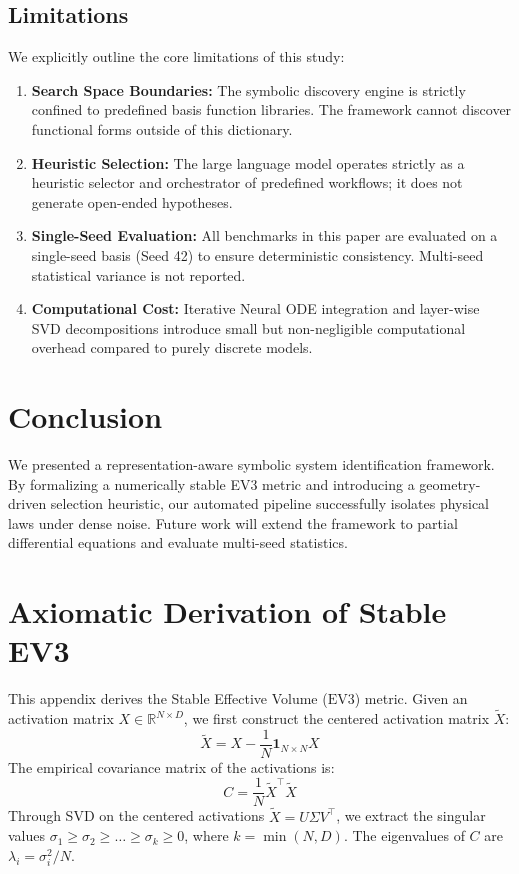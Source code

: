 \documentclass[twocolumn]{article}
\begin{document}
\subsection{Limitations}
We explicitly outline the core limitations of this study:
\begin{enumerate}
    \item \textbf{Search Space Boundaries:} The symbolic discovery engine is strictly confined to predefined basis function libraries. The framework cannot discover functional forms outside of this dictionary.
    \item \textbf{Heuristic Selection:} The large language model operates strictly as a heuristic selector and orchestrator of predefined workflows; it does not generate open-ended hypotheses.
    \item \textbf{Single-Seed Evaluation:} All benchmarks in this paper are evaluated on a single-seed basis (Seed 42) to ensure deterministic consistency. Multi-seed statistical variance is not reported.
    \item \textbf{Computational Cost:} Iterative Neural ODE integration and layer-wise SVD decompositions introduce small but non-negligible computational overhead compared to purely discrete models.
\end{enumerate}

\section{Conclusion}
\label{sec:conclusion}
We presented a representation-aware symbolic system identification framework. By formalizing a numerically stable EV3 metric and introducing a geometry-driven selection heuristic, our automated pipeline successfully isolates physical laws under dense noise. Future work will extend the framework to partial differential equations and evaluate multi-seed statistics.




\appendix
\section{Axiomatic Derivation of Stable EV3}
This appendix derives the Stable Effective Volume ($\text{EV3}$) metric. Given an activation matrix $X \in \mathbb{R}^{N \times D}$, we first construct the centered activation matrix $\tilde{X}$:
\begin{equation}
    \tilde{X} = X - \frac{1}{N} \mathbf{1}_{N \times N} X
\end{equation}
The empirical covariance matrix of the activations is:
\begin{equation}
    C = \frac{1}{N} \tilde{X}^\top \tilde{X}
\end{equation}
Through SVD on the centered activations $\tilde{X} = U \Sigma V^\top$, we extract the singular values $\sigma_1 \ge \sigma_2 \ge \dots \ge \sigma_k \ge 0$, where $k = \min(N, D)$. The eigenvalues of $C$ are $\lambda_i = \sigma_i^2 / N$.
\end{document}
